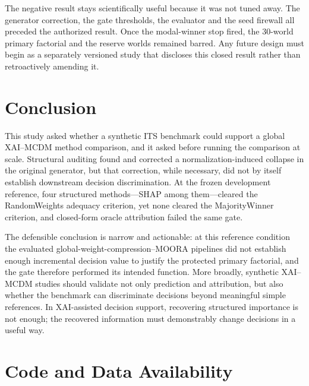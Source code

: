 \documentclass[runningheads,orivec]{llncs}
\newcommand{\MOORA}{MOORA}
\begin{document}
The negative result stays scientifically useful because it was not tuned away. The
generator correction, the gate thresholds, the evaluator and the seed firewall all
preceded the authorized result. Once the modal-winner stop fired, the 30-world primary
factorial and the reserve worlds remained barred. Any future design must begin as a
separately versioned study that discloses this closed result rather than retroactively
amending it.

\section{Conclusion}
\label{sec:conclusion}

This study asked whether a synthetic ITS benchmark could support a global XAI--MCDM
method comparison, and it asked before running the comparison at scale. Structural
auditing found and corrected a normalization-induced collapse in the original
generator, but that correction, while necessary, did not by itself establish downstream
decision discrimination. At the frozen development reference, four structured
methods---SHAP among them---cleared the RandomWeights adequacy criterion, yet none
cleared the MajorityWinner criterion, and closed-form oracle attribution failed the
same gate.

The defensible conclusion is narrow and actionable: at this reference condition the
evaluated global-weight-compression--\MOORA{} pipelines did not establish enough
incremental decision value to justify the protected primary factorial, and the gate
therefore performed its intended function. More broadly, synthetic XAI--MCDM studies
should validate not only prediction and attribution, but also whether the benchmark can
discriminate decisions beyond meaningful simple references. In XAI-assisted decision
support, recovering structured importance is not enough; the recovered information must
demonstrably change decisions in a useful way.

\section*{Code and Data Availability}
\end{document}
